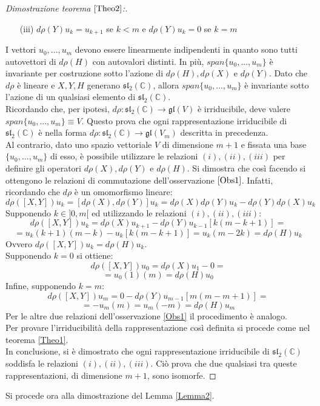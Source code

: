 \documentclass[12pt,a4paper]{report}
\theoremstyle{definition}
\theoremstyle{definition}
\theoremstyle{definition}
\theoremstyle{definition}
\begin{document}
\begin{proof}[Dimostrazione teorema $\ref{Theo2}$:]
\begin{itemize}
		\item[(iii)] $d\rho(Y)u_k=u_{k+1}$ se $k<m$ e $d\rho(Y)u_k=0$ se $k=m$
	\end{itemize}
I vettori $u_0,...,u_m$ devono essere linearmente indipendenti in quanto sono tutti autovettori di $d\rho(H)$ con autovalori distinti. In più, $span\{u_0,...,u_m\}$ è invariante per costruzione sotto l'azione di $d\rho(H),d\rho(X)$ e $d\rho(Y)$. Dato che $d\rho$ è lineare e $X,Y,H$ generano $\mathfrak{sl_2(\mathbb{C})}$, allora $span\{u_0,...,u_m\}$ è invariante sotto l'azione di un qualsiasi elemento di $\mathfrak{sl_2(\mathbb{C})}$.\\
Ricordando che, per ipotesi, $d\rho:\mathfrak{sl_2(\mathbb{C})}\rightarrow \mathfrak{gl}(V)$ è irriducibile, deve valere\\ $span\{u_0,...,u_m\}\equiv V$. Questo prova che ogni rappresentazione irriducibile di $\mathfrak{sl_2(\mathbb{C})}$ è nella forma $d\rho:\mathfrak{sl_2(\mathbb{C})}\rightarrow \mathfrak{gl}(V_m)$ descritta in precedenza.\\
Al contrario, dato uno spazio vettoriale $V$ di dimensione $m+1$ e fissata una base $\{u_0,...,u_m\}$ di esso, è possibile utilizzare le relazioni $(i),(ii),(iii)$ per definire gli operatori $d\rho(X),d\rho(Y)$ e $d\rho(H)$. Si dimostra che così facendo si ottengono le relazioni di commutazione dell'osservazione $\ref{Obs1}$. Infatti, ricordando che $d\rho$ è un omomorfismo lineare:
$$d\rho([X,Y])u_k=[d\rho(X),d\rho(Y)]u_k=d\rho(X)d\rho(Y)u_k-d\rho(Y)d\rho(X)u_k$$
Supponendo $k\in ]0,m[$ ed utilizzando le relazioni $(i),(ii),(iii)$:
$$d\rho([X,Y])u_k=d\rho(X)u_{k+1}-d\rho(Y)u_{k-1}[k(m-k+1)]=$$
$$=u_k(k+1)(m-k)-u_k[k(m-k+1)]=u_k(m-2k)=d\rho(H)u_k$$
Ovvero $d\rho([X,Y])u_k=d\rho(H)u_k$.\\
Supponendo $k=0$ si ottiene: $$d\rho([X,Y])u_0=d\rho(X)u_{1}-0=$$
$$=u_0(1)(m)=d\rho(H)u_0$$
Infine, supponendo $k=m$:
$$d\rho([X,Y])u_m=0-d\rho(Y)u_{m-1}[m(m-m+1)]=$$
$$=-u_m(m)=u_m(-m)=d\rho(H)u_m$$
Per le altre due relazioni dell'osservazione \ref{Obs1} il procedimento è analogo.\\
Per provare l'irriducibilità della rappresentazione così definita si procede come nel teorema \ref{Theo1}.\\
In conclusione, si è dimostrato che ogni rappresentazione irriducibile di $\mathfrak{sl_2(\mathbb{C})}$ soddisfa le relazioni $(i),(ii),(iii)$. Ciò prova che due qualsiasi tra queste rappresentazioni, di dimensione $m+1$, sono isomorfe.
\end{proof}
Si procede ora alla dimostrazione del Lemma \ref{Lemma2}.
\end{document}
